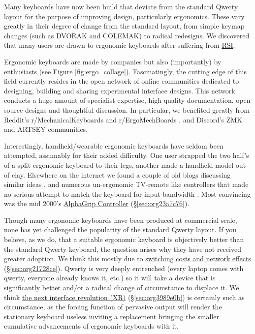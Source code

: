 \documentclass[logo,bsc,singlespacing,parskip]{infthesis}
\begin{document}
Many keyboards have now been build that deviate from the standard Qwerty layout for the purpose of improving design, particularly ergonomics.
These vary greatly in their degree of change from the standard layout, from simple keymap changes (such as DVORAK and COLEMAK) to radical redesigns.
We discovered that many users are drawn to ergonomic keyboards after suffering from \hyperref[orgc186d45]{RSI}.

Ergonomic keyboards are made by companies but also (importantly) by enthusiasts (see Figure \ref{fig:ergo_collage}).
Fascinatingly, the cutting edge of this field currently resides in the open network of online communities dedicated to designing, building and sharing  experimental interface designs.
This network conducts a huge amount of specialist expertise, high quality documentation, open source designs and thoughtful discussion.
In particular, we benefited greatly from Reddit's r/MechanicalKeyboards \autocite{MechanicalKeyboardsAllClick} and  r/ErgoMechBoards \autocite{ErgoMechBoards} , and Discord's ZMK and ARTSEY communities.

Interestingly, handheld/wearable ergonomic keyboards have seldom been attempted, assumably for their added difficulty.
One user strapped the two half's of a split ergonomic keyboard to their legs, another made a handheld model out of clay.
Elsewhere on the internet we found a couple of old blogs discussing similar ideas \autocite{ChorditeAnotherOnehand}, and numerous un-ergonomic TV-remote like controllers that made no serious attempt to match the keyboard for input bandwidth \autocite{TwiddlerTekGear} .
Most convincing was the mid 2000's \hyperref[sec:org23a7c76]{AlphaGrip Controller} (\S \ref{sec:org23a7c76}).

Though many ergonomic keyboards have been produced at commercial scale, none has yet challenged the popularity of the standard Qwerty layout.
If you believe, as we do, that a suitable ergonomic keyboard is objectively better than the standard Qwerty keyboard, the question arises why they have not received greater adoption.
We think this mostly due to \hyperref[sec:org21728ce]{switching costs and network effects} (\S \ref{sec:org21728ce}).
Qwerty is very deeply entrenched (every laptop comes with qwerty, everyone already knows it, etc.) so it will take a device that is significantly better and/or a radical change of circumstance to displace it.
We think \hyperref[sec:org3989e0b]{the next interface revolution (XR)} (\S \ref{sec:org3989e0b}) is certainly such as circumstance, as the forcing function of pervasive output will render the stationary keyboard useless inviting a replacement bringing the smaller cumulative advancements of ergonomic keyboards with it.
\end{document}
